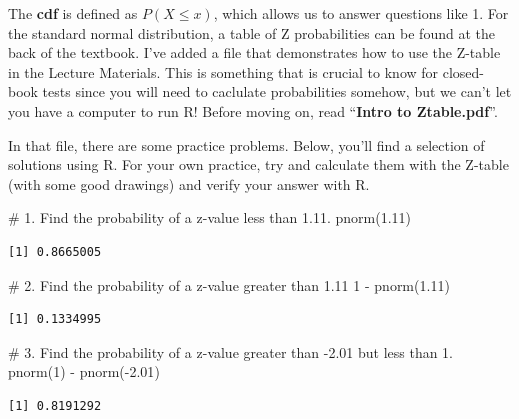 \documentclass[
  letterpaper,
  DIV=11,
  numbers=noendperiod]{scrreprt}
\newenvironment{Shaded}{\begin{snugshade}}{\end{snugshade}}
\newcommand{\CommentTok}[1]{\textcolor[rgb]{0.37,0.37,0.37}{#1}}
\newcommand{\DecValTok}[1]{\textcolor[rgb]{0.68,0.00,0.00}{#1}}
\newcommand{\FloatTok}[1]{\textcolor[rgb]{0.68,0.00,0.00}{#1}}
\newcommand{\FunctionTok}[1]{\textcolor[rgb]{0.28,0.35,0.67}{#1}}
\newcommand{\NormalTok}[1]{\textcolor[rgb]{0.00,0.23,0.31}{#1}}
\newcommand{\SpecialCharTok}[1]{\textcolor[rgb]{0.37,0.37,0.37}{#1}}
\begin{document}
The \textbf{cdf} is defined as \(P(X\le x)\), which allows us to answer
questions like 1. For the standard normal distribution, a table of Z
probabilities can be found at the back of the textbook. I've added a
file that demonstrates how to use the Z-table in the Lecture Materials.
This is something that is crucial to know for closed-book tests since
you will need to caclulate probabilities somehow, but we can't let you
have a computer to run R! Before moving on, read ``\textbf{Intro to
Ztable.pdf}''.

In that file, there are some practice problems. Below, you'll find a
selection of solutions using R. For your own practice, try and calculate
them with the Z-table (with some good drawings) and verify your answer
with R.

\begin{Shaded}
\begin{Highlighting}[]
\CommentTok{\# 1. Find the probability of a z{-}value less than 1.11.}
\FunctionTok{pnorm}\NormalTok{(}\FloatTok{1.11}\NormalTok{)}
\end{Highlighting}
\end{Shaded}

\begin{verbatim}
[1] 0.8665005
\end{verbatim}

\begin{Shaded}
\begin{Highlighting}[]
\CommentTok{\# 2. Find the probability of a z{-}value greater than 1.11}
\DecValTok{1} \SpecialCharTok{{-}} \FunctionTok{pnorm}\NormalTok{(}\FloatTok{1.11}\NormalTok{)}
\end{Highlighting}
\end{Shaded}

\begin{verbatim}
[1] 0.1334995
\end{verbatim}

\begin{Shaded}
\begin{Highlighting}[]
\CommentTok{\# 3. Find the probability of a z{-}value greater than {-}2.01 but less than 1.}
\FunctionTok{pnorm}\NormalTok{(}\DecValTok{1}\NormalTok{) }\SpecialCharTok{{-}} \FunctionTok{pnorm}\NormalTok{(}\SpecialCharTok{{-}}\FloatTok{2.01}\NormalTok{)}
\end{Highlighting}
\end{Shaded}

\begin{verbatim}
[1] 0.8191292
\end{verbatim}
\end{document}
